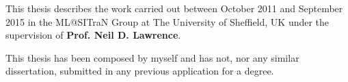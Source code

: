 
\begin{declaration}
This thesis describes the work carried out between October 2011 and September 2015 in the ML@SITraN Group at The University of Sheffield, UK under the supervision of \textbf{Prof. Neil D. Lawrence}.

This thesis has been composed by myself and has not, nor any similar dissertation, submitted in
any previous application for a degree.
\end{declaration}

